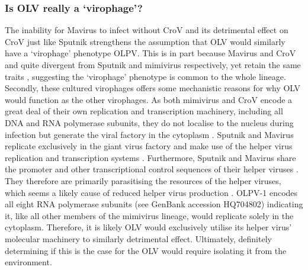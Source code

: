 \subsubsection{Is \ac{OLV} really a `virophage'?}
The inability for Mavirus to infect without \ac{CroV} and its detrimental effect on \ac{CroV} just like Sputnik strengthens the assumption that OLV would similarly have a `virophage' phenotype \ac{OLPV}.
This is in part because Mavirus and \ac{CroV} and quite divergent from Sputnik and mimivirus respectively, yet retain the same traits \cite{Fischer2010, Fischer2011}, suggesting the `virophage' phenotype is common to the whole lineage.
Secondly, these cultured virophages offers some mechanistic reasons for why \ac{OLV} would function as the other virophages.
As both mimivirus and \ac{CroV} encode a great deal of their own replication and transcription machinery, including all \textsc{DNA} and \textsc{RNA} polymerase subunits, they do not localise to the nucleus during infection but generate the viral factory in the cytoplasm \cite{LaScola2008, Fischer2011}.
Sputnik and Mavirus replicate exclusively in the giant virus factory and make use of the helper virus replication and transcription systems \cite{LaScola2008, Fischer2011}.
Furthermore, Sputnik and Mavirus share the promoter and other transcriptional control sequences of their helper viruses \cite{Claverie2009, Fischer2011}.
They therefore are primarily parasitising the resources of the helper viruses, which seems a likely cause of reduced helper virus production \cite{Claverie2009, Fischer2011}.
\ac{OLPV}-1 encodes all eight \textsc{RNA} polymerase subunits (see GenBank accession HQ704802) indicating it, like all other members of the mimivirus lineage, would replicate solely in the cytoplasm.
Therefore, it is likely \ac{OLV} would exclusively utilise its helper virus' molecular machinery to similarly detrimental effect.
Ultimately, definitely determining if this is the case for the \ac{OLV} would require isolating it from the environment.

